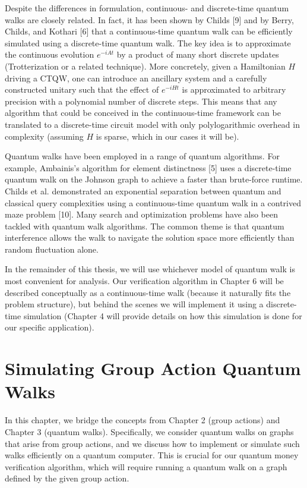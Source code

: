 \documentclass[11pt]{article}
\theoremstyle{definition}
\begin{document}
Despite the differences in formulation, continuous- and discrete-time quantum walks are closely related. In fact, it has been shown by Childs [9] and by Berry, Childs, and Kothari [6] that a continuous-time quantum walk can be efficiently simulated using a discrete-time quantum walk. The key idea is to approximate the continuous evolution $e^{-iAt}$ by a product of many short discrete updates (Trotterization or a related technique). More concretely, given a Hamiltonian $H$ driving a CTQW, one can introduce an ancillary system and a carefully constructed unitary such that the effect of $e^{-iHt}$ is approximated to arbitrary precision with a polynomial number of discrete steps. This means that any algorithm that could be conceived in the continuous-time framework can be translated to a discrete-time circuit model with only polylogarithmic overhead in complexity (assuming $H$ is sparse, which in our cases it will be).

Quantum walks have been employed in a range of quantum algorithms. For example, Ambainis’s algorithm for element distinctness [5] uses a discrete-time quantum walk on the Johnson graph to achieve a faster than brute-force runtime. Childs et al. demonstrated an exponential separation between quantum and classical query complexities using a continuous-time quantum walk in a contrived maze problem [10]. Many search and optimization problems have also been tackled with quantum walk algorithms. The common theme is that quantum interference allows the walk to navigate the solution space more efficiently than random fluctuation alone.

In the remainder of this thesis, we will use whichever model of quantum walk is most convenient for analysis. Our verification algorithm in Chapter 6 will be described conceptually as a continuous-time walk (because it naturally fits the problem structure), but behind the scenes we will implement it using a discrete-time simulation (Chapter 4 will provide details on how this simulation is done for our specific application). 

\chapter{Simulating Group Action Quantum Walks}
In this chapter, we bridge the concepts from Chapter 2 (group actions) and Chapter 3 (quantum walks). Specifically, we consider quantum walks on graphs that arise from group actions, and we discuss how to implement or simulate such walks efficiently on a quantum computer. This is crucial for our quantum money verification algorithm, which will require running a quantum walk on a graph defined by the given group action.
\end{document}

